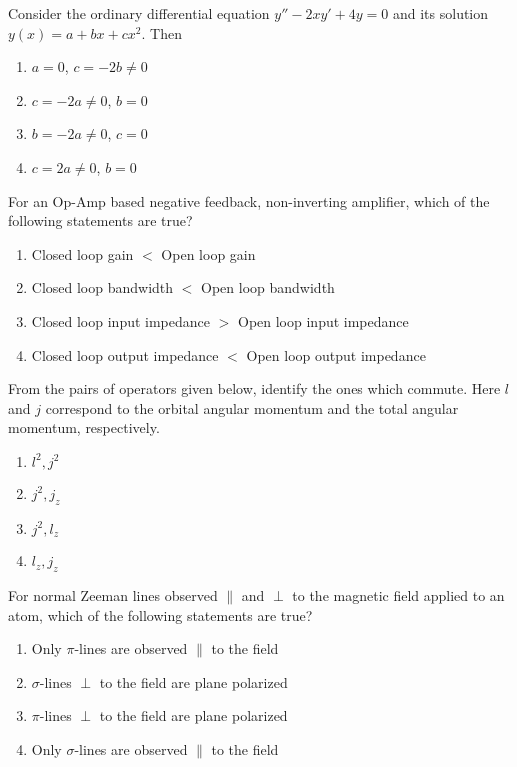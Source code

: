 \item Consider the ordinary differential equation
$y'' - 2xy' + 4y = 0$
and its solution $y(x) = a + bx + cx^2$. Then
\begin{enumerate}
    \item $a = 0$, $c = -2b \neq 0$
    \item $c = -2a \neq 0$, $b = 0$
    \item $b = -2a \neq 0$, $c = 0$
    \item $c = 2a \neq 0$, $b = 0$
\end{enumerate}
\item For an Op-Amp based negative feedback, non-inverting amplifier, which of the following statements are true?
\begin{enumerate}
    \item Closed loop gain $<$ Open loop gain
    \item Closed loop bandwidth $<$ Open loop bandwidth
    \item Closed loop input impedance $>$ Open loop input impedance
    \item Closed loop output impedance $<$ Open loop output impedance
\end{enumerate}

\item From the pairs of operators given below, identify the ones which commute. Here $l$ and $j$ correspond to the orbital angular momentum and the total angular momentum, respectively.
\begin{enumerate}
    \item $l^2, j^2$
    \item $j^2, j_z$
    \item $j^2, l_z$
    \item $l_z, j_z$
\end{enumerate}
\item For normal Zeeman lines observed $\parallel$ and $\perp$ to the magnetic field applied to an atom, which of the following statements are true?
    \begin{enumerate}
        \item Only $\pi$-lines are observed $\parallel$ to the field
        \item $\sigma$-lines $\perp$ to the field are plane polarized
        \item $\pi$-lines $\perp$ to the field are plane polarized
        \item Only $\sigma$-lines are observed $\parallel$ to the field
    \end{enumerate}


